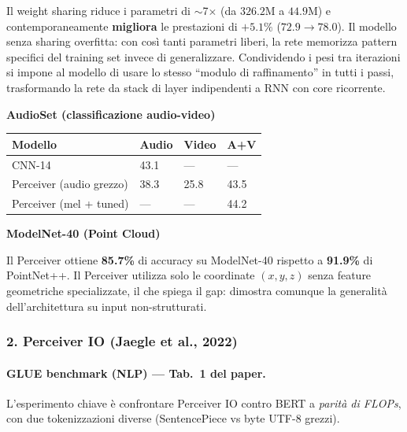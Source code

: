 \documentclass[
  11pt,
]{article}
\begin{document}
\begin{notabox}[title={\textbf{Weight sharing come regolarizzatore}}]
Il weight sharing riduce i parametri di $\sim$7$\times$ (da $326.2$M a $44.9$M) e contemporaneamente \textbf{migliora} le prestazioni di $+5.1\%$ ($72.9 \to 78.0$). Il modello senza sharing overfitta: con così tanti parametri liberi, la rete memorizza pattern specifici del training set invece di generalizzare. Condividendo i pesi tra iterazioni si impone al modello di usare lo stesso ``modulo di raffinamento'' in tutti i passi, trasformando la rete da stack di layer indipendenti a RNN con core ricorrente.
\end{notabox}

\textbf{AudioSet (classificazione audio-video)}

{\small
\begin{longtable}{@{}p{4.5cm} p{2.2cm} p{2.2cm} p{2.2cm}@{}}
\toprule
\textbf{Modello} & \textbf{Audio} & \textbf{Video} & \textbf{A+V} \\
\midrule
\endhead
CNN-14 & 43.1 & --- & --- \\[2pt]
Perceiver (audio grezzo) & 38.3 & 25.8 & 43.5 \\[2pt]
Perceiver (mel + tuned) & --- & --- & 44.2 \\
\bottomrule
\end{longtable}
}

\textbf{ModelNet-40 (Point Cloud)}

Il Perceiver ottiene \textbf{85.7\%} di accuracy su ModelNet-40 rispetto a \textbf{91.9\%} di PointNet++. Il Perceiver utilizza solo le coordinate $(x,y,z)$ senza feature geometriche specializzate, il che spiega il gap: dimostra comunque la generalità dell'architettura su input non-strutturati.

\subsubsection*{2. Perceiver IO (Jaegle et al., 2022)}

\paragraph{GLUE benchmark (NLP) --- Tab.\ 1 del paper.} L'esperimento chiave è confrontare Perceiver IO contro BERT a \emph{parità di FLOPs}, con due tokenizzazioni diverse (SentencePiece vs byte UTF-8 grezzi).
\end{document}

